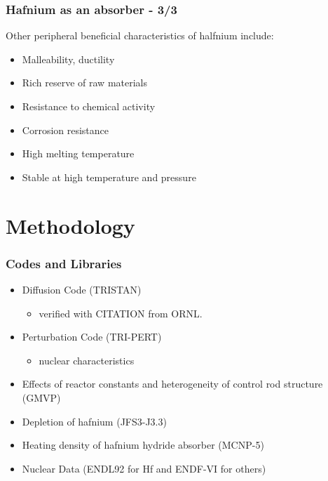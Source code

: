 \documentclass[9pt]{beamer}
\begin{document}
\begin{frame}
\frametitle{Hafnium as an absorber - 3/3}
Other peripheral beneficial characteristics of halfnium include:
\begin{itemize}
  \item Malleability, ductility
  \item Rich reserve of raw materials
  \item Resistance to chemical activity
  \item Corrosion resistance
  \item High melting temperature
  \item Stable at high temperature and pressure
\end{itemize}
\end{frame}

\section{Methodology}

\begin{frame}
\frametitle{Codes and Libraries}
\begin{itemize}
\item Diffusion Code (TRISTAN)
  \begin{itemize}
    \item verified with CITATION from \gls{ORNL}.
  \end{itemize}
\item Perturbation Code (TRI-PERT)
  \begin{itemize}
  \item nuclear characteristics
  \end{itemize}
\item Effects of reactor constants and heterogeneity of control rod structure (GMVP)
\item Depletion of hafnium (JFS3-J3.3)
\item Heating density of hafnium hydride absorber (MCNP-5)
\item Nuclear Data (ENDL92 for Hf and ENDF-VI for others)
\end{itemize}
\end{frame}
\end{document}
